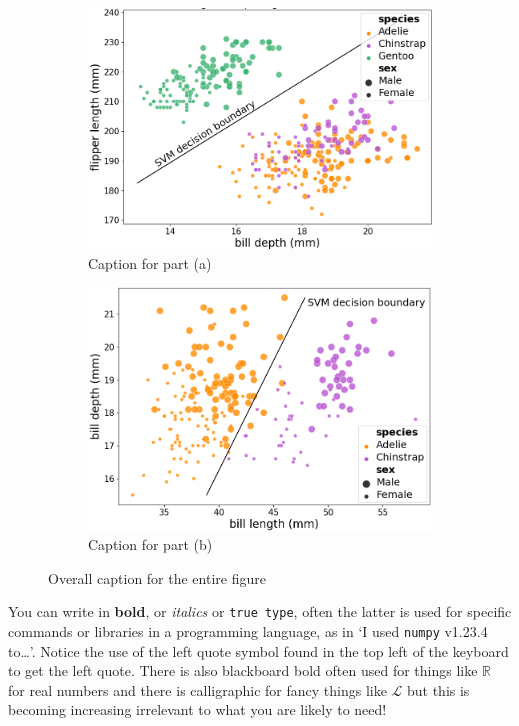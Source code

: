 \documentclass[12pt]{article}
\begin{document}
\begin{figure}
  \begin{subfigure}{0.5\textwidth}
    \centering
    \includegraphics[width=1.05\textwidth]{sup_fliplen_billdepth.png} %
    \caption{Caption for part (a)}
    \label{fig:part_a}
  \end{subfigure}
  \hfill
  \begin{subfigure}{0.5\textwidth}
    \centering
    \includegraphics[width=1.05\textwidth]{sup_billlen_billdepth.png} %
    \caption{Caption for part (b)}
    \label{fig:part_b}
  \end{subfigure}
  \caption{Overall caption for the entire figure}
  \label{fig:entire_figure}
\end{figure}

You can write in \textbf{bold}, or \textsl{italics} or \texttt{true
  type}, often the latter is used for specific commands or libraries in a
programming language, as in `I used \texttt{numpy} v1.23.4 to\ldots'. Notice the use of the left quote symbol found in the top left of the keyboard to get the left quote. There is also blackboard bold often used for things like $\mathbb{R}$ for real numbers and there is calligraphic for fancy things like $\mathcal{L}$ but this is becoming increasing irrelevant to what you are likely to need! 




\printbibliography
\end{document}

